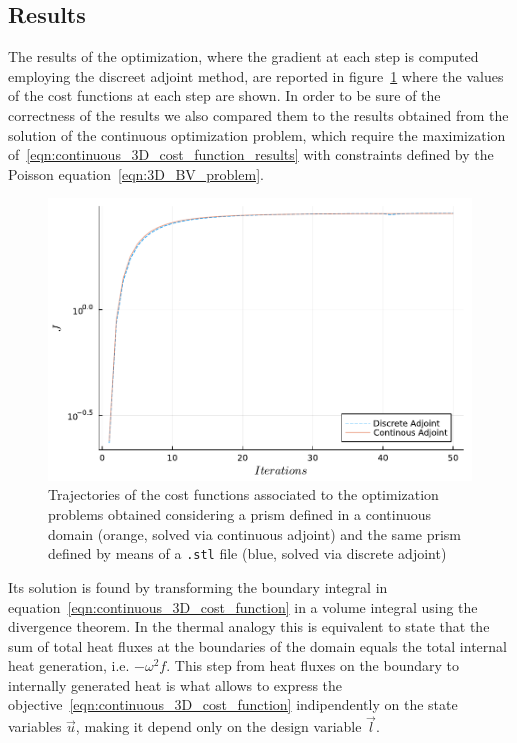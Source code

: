 \subsection{Results}

The results of the optimization, where the gradient at each step is computed employing the discreet adjoint method, are reported in figure~\ref{fig:opt_history_3D} where the values of the cost functions at each step are shown. In order to be sure of the correctness of the results we also compared them to the results obtained from the solution of the continuous optimization problem, which require the maximization of~\eqref{eqn:continuous_3D_cost_function_results} with constraints defined by the Poisson equation~\eqref{eqn:3D_BV_problem}.

\begin{figure}
	\centering
	\includegraphics[width=.75\textwidth]{img/cost_vs_iter_3D_discrete_vs_continuous_adjoint}
	\caption{Trajectories of the cost functions associated to the optimization problems obtained considering a prism defined in a continuous domain (orange, solved via continuous adjoint) and the same prism defined by means of a \texttt{.stl} file (blue, solved via discrete adjoint)}
	\label{fig:opt_history_3D}
\end{figure}

\smallskip
Its solution is found by transforming the boundary integral in equation~\eqref{eqn:continuous_3D_cost_function} in a volume integral using the divergence theorem. In the thermal analogy this is equivalent to state that the sum of total heat fluxes at the boundaries of the domain equals the total internal heat generation, i.e. $-\omega^2 f$. This step from heat fluxes on the boundary to internally generated heat is what allows to express the objective~\eqref{eqn:continuous_3D_cost_function} indipendently on the state variables $\vec{u}$, making it depend only on the design variable $\vec{l}$.

